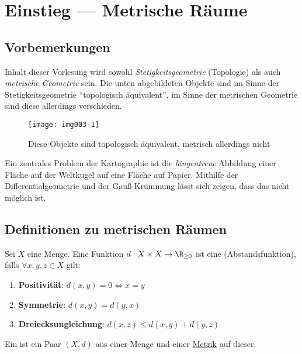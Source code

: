 \chapter{Einstieg --- Metrische Räume}

\section{Vorbemerkungen}

Inhalt dieser Vorlesung wird sowohl \emph{Stetigkeitsgeometrie} (Topologie) als auch \emph{metrische Geometrie} sein. Die unten abgebildeten Objekte sind im Sinne der Stetigkeitsgeometrie ``topologisch äquivalent'', im Sinne der metrischen Geometrie sind diese allerdings verschieden.

\begin{figure}[H]\label{img003-1}
  \texttt{[image: img003-1]}
  \caption{Diese Objekte sind topologisch äquivalent, metrisch allerdings nicht}
\end{figure}

\begin{remark}[Kartographieproblem]
  Ein zentrales Problem der Kartographie ist die \emph{längentreue} Abbildung einer Fläche auf der Weltkugel auf eine Fläche auf Papier. Mithilfe der Differentialgeometrie und der Gauß-Krümmung lässt sich zeigen, dass das nicht möglich ist.
\end{remark}

\section{Definitionen zu metrischen Räumen}

\begin{definition}[Metrik]\label{def:metrik}
  Sei \( X \) eine Menge. Eine Funktion \( d: X \times X \to \R_{\geq 0} \) ist eine  (Abstandsfunktion), falls $ \forall x, y, z \in X $ gilt:
  \begin{enumerate}
    \item \textbf{Positivität}: $ d(x, y) = 0 \Leftrightarrow x = y $ 
    \item \textbf{Symmetrie}: $ d(x,y) = d(y,x) $
    \item \textbf{Dreiecksungleichung}: $ d(x,z) \leq d(x,y) + d(y,z) $
  \end{enumerate}
\end{definition}

\begin{definition}
  \label{def:metrischerRaum}
  Ein  ist ein Paar $ (X,d) $ aus einer Menge und einer \hyperref[def:metrik]{Metrik} auf dieser.
\end{definition}


